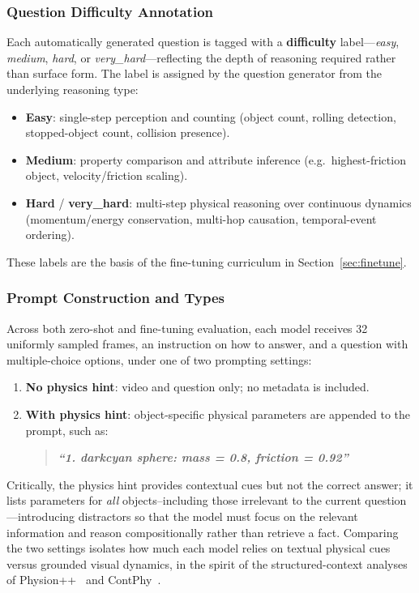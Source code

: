 \documentclass[conference]{IEEEtran}
\begin{document}
\subsubsection{Question Difficulty Annotation}
\label{sec:difficulty}
Each automatically generated question is tagged with a \textbf{difficulty} label---\textit{easy}, \textit{medium}, \textit{hard}, or \textit{very\_hard}---reflecting the depth of reasoning required rather than surface form. The label is assigned by the question generator from the underlying reasoning type:
\begin{itemize}
  \item \textbf{Easy}: single-step perception and counting (object count, rolling detection, stopped-object count, collision presence).
  \item \textbf{Medium}: property comparison and attribute inference (e.g.\ highest-friction object, velocity/friction scaling).
  \item \textbf{Hard} / \textbf{very\_hard}: multi-step physical reasoning over continuous dynamics (momentum/energy conservation, multi-hop causation, temporal-event ordering).
\end{itemize}
These labels are the basis of the fine-tuning curriculum in Section~\ref{sec:finetune}.


\subsubsection{Prompt Construction and Types}
\label{sec:prompt-types}

Across both zero-shot and fine-tuning evaluation, each model receives 32 uniformly sampled frames, an instruction on how to answer, and a question with multiple-choice options, under one of two prompting settings:
\begin{enumerate}
    \item \textbf{No physics hint}: video and question only; no metadata is included.
    \item \textbf{With physics hint}: object-specific physical parameters are appended to the prompt, such as:
    \begin{quote}
      \textbf{\textit{``1. darkcyan sphere: mass = 0.8, friction = 0.92''}}
    \end{quote}
\end{enumerate}
Critically, the physics hint provides contextual cues but not the correct answer; it lists parameters for \emph{all} objects--including those irrelevant to the current question---introducing distractors so that the model must focus on the relevant information and reason compositionally rather than retrieve a fact. Comparing the two settings isolates how much each model relies on textual physical cues versus grounded visual dynamics, in the spirit of the structured-context analyses of Physion++~\cite{tung2023physion++} and ContPhy~\cite{zhang2024contphy}.
\end{document}
